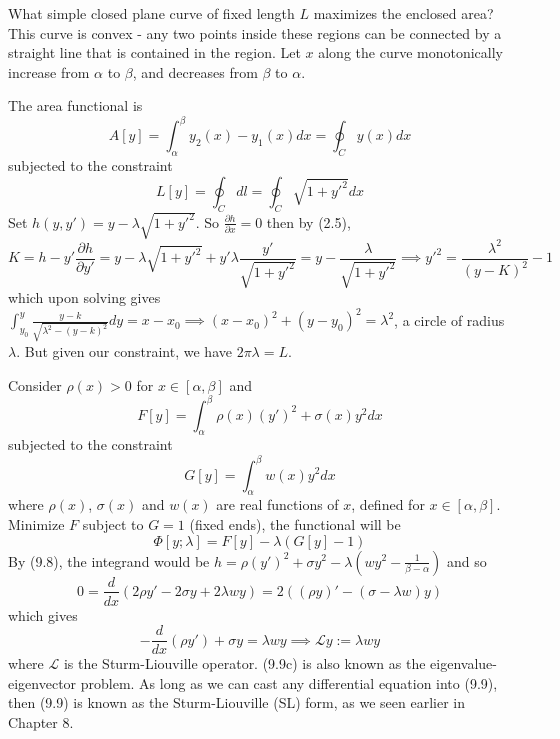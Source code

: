 \documentclass[a4paper]{article}
\begin{document}
\begin{eg}
What simple closed plane curve of fixed length $L$ maximizes the enclosed area? This curve is convex - any two points inside these regions can be connected by a straight line that is contained in the region. Let $x$ along the curve monotonically increase from $\alpha$ to $\beta$, and decreases from $\beta$ to $\alpha$.
\begin{center}
  \end{center}
The area functional is
$$A[y]=\int_\alpha^\beta y_2(x)-y_1(x)dx=\oint_Cy(x)dx$$
subjected to the constraint $$L[y]=\oint_Cdl=\oint_C\sqrt{1+y'^2}dx$$
Set $h(y,y')=y-\lambda\sqrt{1+y'^2}$. So $\frac{\partial h}{\partial x}=0$ then by (2.5),
$$K=h-y'\frac{\partial h}{\partial y'}=y-\lambda\sqrt{1+y'^2}+y'\lambda\frac{y'}{\sqrt{1+y'^2}}=y-\frac{\lambda}{\sqrt{1+y'^2}}\implies y'^2=\frac{\lambda^2}{(y-K)^2}-1$$
which upon solving gives $\int_{y_0}^y\frac{y-k}{\sqrt{\lambda^2-(y-k)^2}}dy=x-x_0\implies (x-x_0)^2+(y-y_0)^2=\lambda^2$, a circle of radius $\lambda$. But given our constraint, we have $2\pi\lambda=L$.
\end{eg}
\begin{eg}
Consider $\rho(x)>0$ for $x\in[\alpha,\beta]$ and
\begin{equation}
F[y]=\int_\alpha^\beta\rho(x)(y')^2+\sigma(x)y^2dx\tag{9.9a}
\end{equation}
subjected to the constraint
\begin{equation}
G[y]=\int_\alpha^\beta w(x)y^2dx\tag{9.9b}
\end{equation}
where $\rho(x)$, $\sigma(x)$ and $w(x)$ are real functions of $x$, defined for $x\in[\alpha,\beta]$. Minimize $F$ subject to $G=1$ (fixed ends), the functional will be
$$\Phi[y;\lambda]=F[y]-\lambda(G[y]-1)$$
By (9.8), the integrand would be $h=\rho(y')^2+\sigma y^2-\lambda(wy^2-\frac{1}{\beta-\alpha})$ and so
$$0=\frac{d}{dx}(2\rho y'-2\sigma y+2\lambda wy)=2((\rho y)'-(\sigma-\lambda w)y)$$
which gives
\begin{equation}
-\frac{d}{dx}(\rho y')+\sigma y=\lambda w y\implies\mathcal{L}y:=\lambda wy\tag{9.9c}
\end{equation}
where $\mathcal{L}$ is the Sturm-Liouville operator. (9.9c) is also known as the eigenvalue-eigenvector problem. As long as we can cast any differential equation into (9.9), then (9.9) is known as the Sturm-Liouville (SL) form, as we seen earlier in Chapter 8.
\end{eg}
\end{document}
